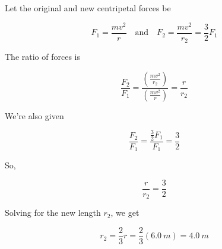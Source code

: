 \documentclass[answers]{exam}
\begin{document}
\begin{questions}
\bigskip

\begin{minipage}{0.3\textwidth}
\centering
{}
\end{minipage}
\hspace{1em}%

\begin{solution}
Let the original and new centripetal forces be

\begin{equation*}
    F_1 = \frac{mv^2}{r} \quad \text{and} \quad F_2 = \frac{mv^2}{r_2} = \frac{3}{2} F_1
\end{equation*}

The ratio of forces is

\begin{equation*}
    \frac{F_2}{F_1} = \frac{\displaystyle \left(\frac{mv^2}{r_2}\right)}{\left(\displaystyle \frac{mv^2}{r}\right)} = \frac{r}{r_2}
\end{equation*}

We're also given

\begin{equation*}
    \frac{F_2}{F_1} = \frac{\frac{3}{2}F_1}{F_1} = \frac{3}{2}
\end{equation*}

So,

\begin{equation*}
    \frac{r}{r_2} = \frac{3}{2}
\end{equation*}

Solving for the new length $r_2$, we get

\begin{equation*}
    r_2 = \frac{2}{3}r = \frac{2}{3} (\SI{6.0}{m}) = \boxed{\SI{4.0}{m}}
\end{equation*}
\end{solution}

\end{questions}
\end{document}
